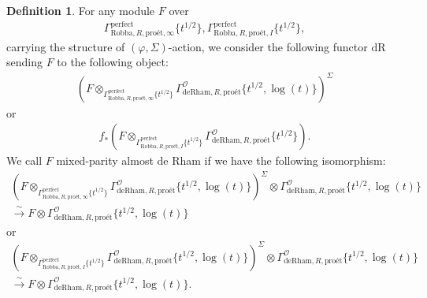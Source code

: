 \documentclass[12pt]{book}
\theoremstyle{definition}
\newtheorem{definition}{Definition}
\begin{document}
\begin{definition}
For any module $F$ over 
\begin{align}
\Gamma^\mathrm{perfect}_{\text{Robba},R,\text{pro\'et},\infty}\{t^{1/2}\},\Gamma^\mathrm{perfect}_{\text{Robba},R,\text{pro\'et},I}\{t^{1/2}\},
\end{align} 
carrying the structure of $(\varphi,\Sigma)$-action, we consider the following functor $\mathrm{dR}$ sending $F$ to the following object:
\begin{align}
(F\otimes_{\Gamma^\mathrm{perfect}_{\text{Robba},R,\text{pro\'et},\infty}\{t^{1/2}\}} \Gamma^\mathcal{O}_{\text{deRham},R,\text{pro\'et}}\{t^{1/2},\log(t)\})^\Sigma
\end{align}
or 
\begin{align}
f_*(F\otimes_{\Gamma^\mathrm{perfect}_{\text{Robba},R,\text{pro\'et},I}\{t^{1/2}\}} \Gamma^\mathcal{O}_{\text{deRham},R,\text{pro\'et}}\{t^{1/2}\}).
\end{align}
We call $F$ mixed-parity almost de Rham if we have the following isomorphism:
\begin{align}
(F\otimes_{\Gamma^\mathrm{perfect}_{\text{Robba},R,\text{pro\'et},\infty}\{t^{1/2}\}} \Gamma^\mathcal{O}_{\text{deRham},R,\text{pro\'et}}\{t^{1/2},\log(t)\})^\Sigma \otimes \Gamma^\mathcal{O}_{\text{deRham},R,\text{pro\'et}}\{t^{1/2},\log(t)\} \\
\overset{\sim}{\longrightarrow} F \otimes \Gamma^\mathcal{O}_{\text{deRham},R,\text{pro\'et}}\{t^{1/2},\log(t)\} 
\end{align}
or 
\begin{align}
(F\otimes_{\Gamma^\mathrm{perfect}_{\text{Robba},R,\text{pro\'et},I}\{t^{1/2}\}} \Gamma^\mathcal{O}_{\text{deRham},R,\text{pro\'et}}\{t^{1/2},\log(t)\})^\Sigma \otimes \Gamma^\mathcal{O}_{\text{deRham},R,\text{pro\'et}}\{t^{1/2},\log(t)\}\\ \overset{\sim}{\longrightarrow} F \otimes \Gamma^\mathcal{O}_{\text{deRham},R,\text{pro\'et}}\{t^{1/2},\log(t)\}. 
\end{align}
\end{definition}
\end{document}
